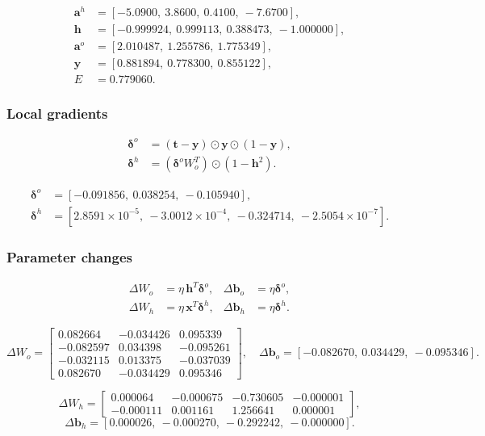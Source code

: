 \documentclass[11pt,a4paper]{article}
\begin{document}
\begin{align*}
\mathbf{a}^{h}&=[-5.0900,\ 3.8600,\ 0.4100,\ -7.6700],\\
\mathbf{h}&=[-0.999924,\ 0.999113,\ 0.388473,\ -1.000000],\\
\mathbf{a}^{o}&=[2.010487,\ 1.255786,\ 1.775349],\\
\mathbf{y}&=[0.881894,\ 0.778300,\ 0.855122],\\
E&=0.779060.
\end{align*}

\subsubsection{Local gradients}
\begin{align}
    \boldsymbol{\delta}^{o}
    &=(\mathbf{t}-\mathbf{y})\odot\mathbf{y}\odot(1-\mathbf{y}),\\
    \boldsymbol{\delta}^{h}
    &=(\boldsymbol{\delta}^{o}W_o^T)\odot(1-\mathbf{h}^2).
\end{align}

\begin{align*}
\boldsymbol{\delta}^{o}
&=[-0.091856,\ 0.038254,\ -0.105940],\\
\boldsymbol{\delta}^{h}
&=[2.8591\!\times\!10^{-5},\ -3.0012\!\times\!10^{-4},\ -0.324714,\ -2.5054\!\times\!10^{-7}].
\end{align*}

\subsubsection{Parameter changes}
\begin{align}
    \Delta W_o &= \eta\,\mathbf{h}^{T}\boldsymbol{\delta}^{o}, &
    \Delta\mathbf{b}_o &= \eta\boldsymbol{\delta}^{o},\\
    \Delta W_h &= \eta\,\mathbf{x}^{T}\boldsymbol{\delta}^{h}, &
    \Delta\mathbf{b}_h &= \eta\boldsymbol{\delta}^{h}.
\end{align}

\[
\Delta W_o=\begin{bmatrix}
 0.082664&-0.034426& 0.095339\\
-0.082597& 0.034398&-0.095261\\
-0.032115& 0.013375&-0.037039\\
 0.082670&-0.034429& 0.095346
\end{bmatrix},\quad
\Delta\mathbf{b}_o=[-0.082670,\ 0.034429,\ -0.095346].
\]

\[
\Delta W_h=\begin{bmatrix}
 0.000064&-0.000675&-0.730605&-0.000001\\
-0.000111& 0.001161& 1.256641& 0.000001
\end{bmatrix},
\]
\[
\Delta\mathbf{b}_h=[0.000026,\ -0.000270,\ -0.292242,\ -0.000000].
\]
\end{document}
